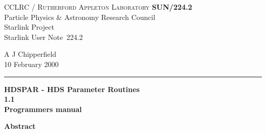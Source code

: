 \documentclass[twoside,11pt]{article}
\newcommand{\stardoccategory}  {Starlink User Note}
\newcommand{\stardocinitials}  {SUN}
\newcommand{\stardocnumber}    {224.2}
\newcommand{\stardocauthors}   {A J Chipperfield}
\newcommand{\stardocdate}      {10 February 2000}
\newcommand{\stardoctitle}     {HDSPAR - HDS Parameter Routines}
\newcommand{\stardocversion}   {1.1}
\newcommand{\stardocmanual}    {Programmers manual}
\newcommand{\stardocname}{\stardocinitials /\stardocnumber}
\newenvironment{latexonly}{}{}
\renewcommand{\_}{\texttt{\symbol{95}}}
\begin{document}
\thispagestyle{empty}

\begin{latexonly}
   CCLRC / \textsc{Rutherford Appleton Laboratory} \hfill \textbf{\stardocname}\\
   {\large Particle Physics \& Astronomy Research Council}\\
   {\large Starlink Project\\}
   {\large \stardoccategory\ \stardocnumber}
   \begin{flushright}
   \stardocauthors\\
   \stardocdate
   \end{flushright}
   \vspace{-4mm}
   \rule{\textwidth}{0.5mm}
   \vspace{5mm}
   \begin{center}
   {\Huge\textbf{\stardoctitle \\ [2.5ex]}}
   {\LARGE\textbf{\stardocversion \\ [4ex]}}
   {\Huge\textbf{\stardocmanual}}
   \end{center}
   \vspace{5mm}


   \vspace{10mm}
   \begin{center}
      {\Large\textbf{Abstract}}
   \end{center}
\end{latexonly}
\end{document}

